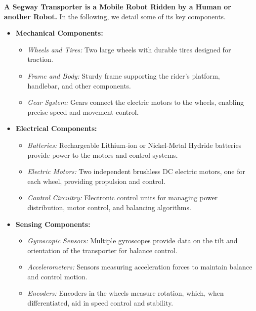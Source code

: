 \textbf{A Segway Transporter is a Mobile Robot Ridden by a Human or another Robot.} In the following, we detail some of its key components.
\begin{itemize}
    \item \textbf{Mechanical Components:}
    \begin{itemize}
        \item \textit{Wheels and Tires:} Two large wheels with durable tires designed for traction.
        \item \textit{Frame and Body:} Sturdy frame supporting the rider's platform, handlebar, and other components.
        \item \textit{Gear System:} Gears connect the electric motors to the wheels, enabling precise speed and movement control.
    \end{itemize}

    \item \textbf{Electrical Components:}
    \begin{itemize}
        \item \textit{Batteries:} Rechargeable Lithium-ion or Nickel-Metal Hydride batteries provide power to the motors and control systems.
        \item \textit{Electric Motors:} Two independent brushless DC electric motors, one for each wheel, providing propulsion and control.
        \item \textit{Control Circuitry:} Electronic control units for managing power distribution, motor control, and balancing algorithms.
    \end{itemize}


    \item \textbf{Sensing Components:}
    \begin{itemize}
        \item \textit{Gyroscopic Sensors:} Multiple gyroscopes provide data on the tilt and orientation of the transporter for balance control.
        \item \textit{Accelerometers:} Sensors measuring acceleration forces to maintain balance and control motion.
        \item \textit{Encoders:} Encoders in the wheels measure rotation, which, when differentiated, aid in speed control and stability.
    \end{itemize}
 \end{itemize}

 \vspace*{.2cm}

